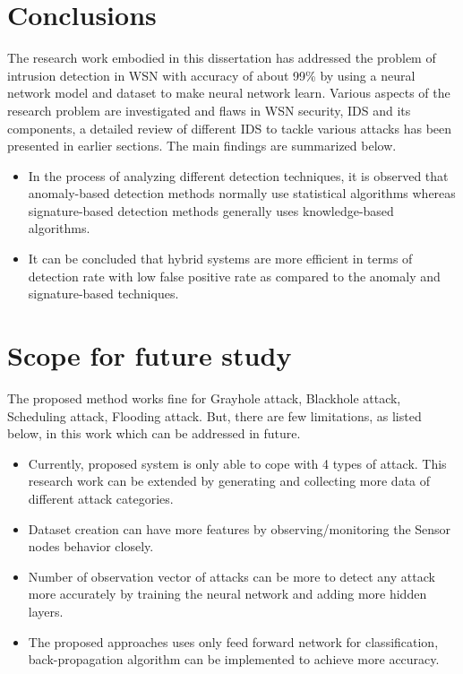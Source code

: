 \section{Conclusions}
The research work embodied in this dissertation has addressed the problem of intrusion detection in WSN with accuracy of about 99\% by using a neural network model and dataset to make neural network learn. Various aspects of the research problem are investigated and flaws in WSN security, IDS and its components, a detailed review of different IDS to tackle various attacks has been presented in earlier sections. The main findings are summarized below.
\begin{itemize}
	\item In the process of analyzing different detection techniques, it is observed that anomaly-based detection methods normally use statistical algorithms whereas signature-based detection methods generally uses knowledge-based algorithms.
	\item It can be concluded that hybrid systems are more efficient in terms of detection rate with low false positive rate as compared to the anomaly and signature-based techniques.
\end{itemize}
\section{Scope for future study}
The proposed method works fine for Grayhole attack, Blackhole attack, Scheduling attack, Flooding attack. But, there are few limitations, as listed below, in this work which can be addressed in future.
\begin{itemize}
	\item Currently, proposed system is only able to cope with 4 types of attack. This research work can be extended by generating and collecting more data of different attack categories.
	\item Dataset creation can have more features by observing/monitoring the Sensor nodes behavior closely.
	\item Number of observation vector of attacks can be more to detect any attack more accurately by training the neural network and adding more hidden layers.
	\item The proposed approaches uses only feed forward network for classification, back-propagation algorithm can be implemented to achieve more accuracy.
	
\end{itemize}


